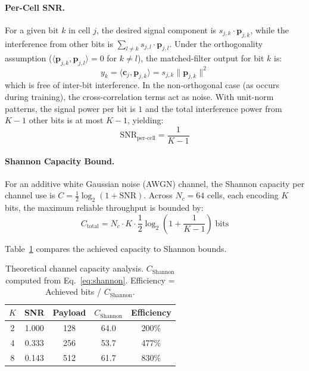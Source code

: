 \documentclass[10pt, twocolumn]{article}
\begin{document}
\paragraph{Per-Cell SNR.}
For a given bit $k$ in cell $j$, the desired signal component is $s_{j,k} \cdot \mathbf{p}_{j,k}$, while the interference from other bits is $\sum_{l \neq k} s_{j,l} \cdot \mathbf{p}_{j,l}$.
Under the orthogonality assumption ($\langle \mathbf{p}_{j,k}, \mathbf{p}_{j,l} \rangle = 0$ for $k \neq l$), the matched-filter output for bit $k$ is:
\begin{equation}
    y_k = \langle \mathbf{c}_j, \mathbf{p}_{j,k} \rangle = s_{j,k} \|\mathbf{p}_{j,k}\|^2
\end{equation}
which is free of inter-bit interference.
In the non-orthogonal case (as occurs during training), the cross-correlation terms act as noise.
With unit-norm patterns, the signal power per bit is $1$ and the total interference power from $K-1$ other bits is at most $K-1$, yielding:
\begin{equation}
    \text{SNR}_\text{per-cell} = \frac{1}{K - 1}
\end{equation}

\paragraph{Shannon Capacity Bound.}
For an additive white Gaussian noise (AWGN) channel, the Shannon capacity per channel use is $C = \frac{1}{2}\log_2(1 + \text{SNR})$.
Across $N_c = 64$ cells, each encoding $K$ bits, the maximum reliable throughput is bounded by:
\begin{equation}
    C_\text{total} = N_c \cdot K \cdot \frac{1}{2} \log_2\!\left(1 + \frac{1}{K-1}\right) \;\text{bits}
    \label{eq:shannon}
\end{equation}

Table~\ref{tab:capacity_theory} compares the achieved capacity to Shannon bounds.

\begin{table}[t]
\centering
\caption{Theoretical channel capacity analysis. $C_\text{Shannon}$ computed from Eq.~\ref{eq:shannon}. Efficiency = Achieved bits / $C_\text{Shannon}$.}
\label{tab:capacity_theory}
\small
\begin{tabular}{@{}ccccc@{}}
\toprule
\textbf{$K$} & \textbf{SNR} & \textbf{Payload} & \textbf{$C_\text{Shannon}$} & \textbf{Efficiency} \\
\midrule
2 & 1.000 & 128 & 64.0 & 200\% \\
4 & 0.333 & 256 & 53.7 & 477\% \\
8 & 0.143 & 512 & 61.7 & 830\% \\
\bottomrule
\end{tabular}
\end{table}
\end{document}
